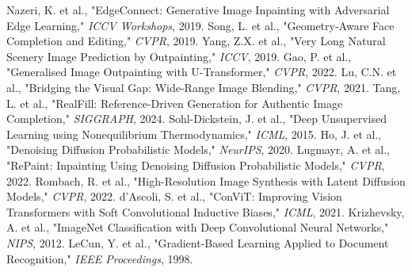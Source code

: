 \documentclass[sigconf]{acmart}
\begin{document}
\begin{thebibliography}{99}
     Nazeri, K. et al., "EdgeConnect: Generative Image Inpainting with Adversarial Edge Learning," \textit{ICCV Workshops}, 2019.
     Song, L. et al., "Geometry-Aware Face Completion and Editing," \textit{CVPR}, 2019.
     Yang, Z.X. et al., "Very Long Natural Scenery Image Prediction by Outpainting," \textit{ICCV}, 2019.
     Gao, P. et al., "Generalised Image Outpainting with U-Transformer," \textit{CVPR}, 2022.
     Lu, C.N. et al., "Bridging the Visual Gap: Wide-Range Image Blending," \textit{CVPR}, 2021.
     Tang, L. et al., "RealFill: Reference-Driven Generation for Authentic Image Completion," \textit{SIGGRAPH}, 2024.
     Sohl-Dickstein, J. et al., "Deep Unsupervised Learning using Nonequilibrium Thermodynamics," \textit{ICML}, 2015.
     Ho, J. et al., "Denoising Diffusion Probabilistic Models," \textit{NeurIPS}, 2020.
     Lugmayr, A. et al., "RePaint: Inpainting Using Denoising Diffusion Probabilistic Models," \textit{CVPR}, 2022.
     Rombach, R. et al., "High-Resolution Image Synthesis with Latent Diffusion Models," \textit{CVPR}, 2022.
     d’Ascoli, S. et al., "ConViT: Improving Vision Transformers with Soft Convolutional Inductive Biases," \textit{ICML}, 2021.
     Krizhevsky, A. et al., "ImageNet Classification with Deep Convolutional Neural Networks," \textit{NIPS}, 2012.
     LeCun, Y. et al., "Gradient-Based Learning Applied to Document Recognition," \textit{IEEE Proceedings}, 1998.
\end{thebibliography}
\end{document}

